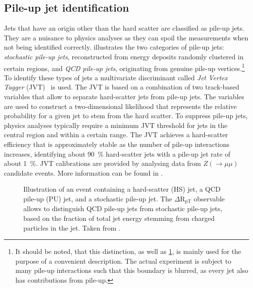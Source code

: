 \subsection{Pile-up jet identification}
Jets that have an origin other than the hard scatter are classified as pile-up jets.
They are a nuisance to physics analyses as they can spoil the measurements when not being identified correctly.
 illustrates the two categories of pile-up jets:
\emph{stochastic pile-up jets}, reconstructed from energy deposits randomly clustered in certain regions, and \emph{QCD pile-up jets}, originating from genuine pile-up vertices.\footnote{It should be noted, that this distinction, as well as \cref{fig:pile-up-jets-illustration}, is mainly used for the purpose of a convenient description. The actual experiment is subject to many pile-up interactions such that this boundary is blurred, as every jet also has contributions from pile-up.}
To identify these types of jets a multivariate discriminant called \emph{Jet Vertex Tagger} (JVT)~\cite{ATLAS-CONF-2014-018} is used.
The JVT is based on a combination of two track-based variables that allow to separate hard-scatter jets from pile-up jets. The variables are used to construct a two-dimensional likelihood that represents the relative probability for a given jet to stem from the hard scatter.
To suppress pile-up jets, physics analyses typically require a minimum JVT threshold for jets in the central region  and within a certain \pT range.
The JVT achieves a hard-scatter efficiency that is approximately stable as the number of pile-up interactions increases, identifying about \SI{90}{\percent} hard-scatter jets with a pile-up jet rate of about \SI{1}{\percent}.
JVT calibrations are provided by analysing data from $Z (\rightarrow \mu\mu)$ candidate events.
More information can be found in .

\FloatBarrier
\begin{figure}[t]
    \caption{Illustration of an event containing a hard-scatter (HS) jet, a QCD pile-up (PU) jet, and a stochastic pile-up jet. The $\Delta \text{R}_{\text{pT}}$ observable allows to distinguish QCD pile-up jets from stochastic pile-up jets, based on the fraction of total jet energy stemming from charged particles in the jet. Taken from .}
    \label{fig:pile-up-jets-illustration}
\end{figure}


